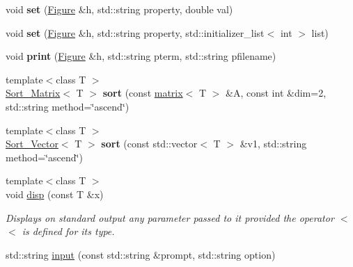\begin{DoxyCompactItemize}
\item 
\hypertarget{namespacekeycpp_afcd6ae07fc18f5374868fe314f00108c}{void {\bfseries set} (\hyperlink{classkeycpp_1_1_figure}{Figure} \&h, std\-::string property, double val)}\label{namespacekeycpp_afcd6ae07fc18f5374868fe314f00108c}

\item 
\hypertarget{namespacekeycpp_a261a9d83dcc8786777d193575b7e1a1c}{void {\bfseries set} (\hyperlink{classkeycpp_1_1_figure}{Figure} \&h, std\-::string property, std\-::initializer\-\_\-list$<$ int $>$ list)}\label{namespacekeycpp_a261a9d83dcc8786777d193575b7e1a1c}

\item 
\hypertarget{namespacekeycpp_af9dec3da4533a1db21a6c6c4fe8e740a}{void {\bfseries print} (\hyperlink{classkeycpp_1_1_figure}{Figure} \&h, std\-::string pterm, std\-::string pfilename)}\label{namespacekeycpp_af9dec3da4533a1db21a6c6c4fe8e740a}

\item 
\hypertarget{namespacekeycpp_aa2641f24e5cec5eddddbd6de2159055f}{{\footnotesize template$<$class T $>$ }\\\hyperlink{structkeycpp_1_1_sort___matrix}{Sort\-\_\-\-Matrix}$<$ T $>$ {\bfseries sort} (const \hyperlink{classkeycpp_1_1matrix}{matrix}$<$ T $>$ \&A, const int \&dim=2, std\-::string method=\char`\"{}ascend\char`\"{})}\label{namespacekeycpp_aa2641f24e5cec5eddddbd6de2159055f}

\item 
\hypertarget{namespacekeycpp_adba3dbd0ed8ce919ffcd445bcf273673}{{\footnotesize template$<$class T $>$ }\\\hyperlink{structkeycpp_1_1_sort___vector}{Sort\-\_\-\-Vector}$<$ T $>$ {\bfseries sort} (const std\-::vector$<$ T $>$ \&v1, std\-::string method=\char`\"{}ascend\char`\"{})}\label{namespacekeycpp_adba3dbd0ed8ce919ffcd445bcf273673}

\item 
\hypertarget{namespacekeycpp_a6a8a286886d48471685b18b7782f1e4a}{{\footnotesize template$<$class T $>$ }\\void \hyperlink{namespacekeycpp_a6a8a286886d48471685b18b7782f1e4a}{disp} (const T \&x)}\label{namespacekeycpp_a6a8a286886d48471685b18b7782f1e4a}

\begin{DoxyCompactList}\small\item\em Displays on standard output any parameter passed to it provided the operator $<$$<$ is defined for its type. \end{DoxyCompactList}\item 
\hypertarget{namespacekeycpp_aba69db64fe38ad271de1939d3f1a5520}{std\-::string \hyperlink{namespacekeycpp_aba69db64fe38ad271de1939d3f1a5520}{input} (const std\-::string \&prompt, std\-::string option)}\label{namespacekeycpp_aba69db64fe38ad271de1939d3f1a5520}


\end{DoxyCompactItemize}
